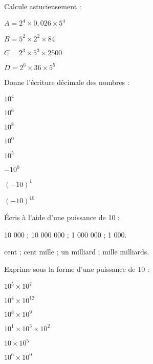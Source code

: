 \begin{exercice}[]
Calcule astucieusement :
\begin{colenumerate}{2} 
\item $A = 2^4 \times 0,026 \times 5^4$
\item $B = 5^2 \times 2^2 \times 84$
\item $C = 2^3 \times 5^3 \times 2 500$
\item $D = 2^6 \times 36 \times 5^5$
\end{colenumerate}
\end{exercice}





\begin{exercice}[]
Donne l'écriture décimale des nombres :

\begin{colenumerate}{4} 
\item $10^4$
\item $10^6$ 
\item $10^8$ 
\item $10^0$
\item $10^5$
\item $-10^0$
\item $(-10)^1$
\item $(-10)^{10}$
\end{colenumerate} 
\end{exercice}

\begin{exercice}[]
Écris à l'aide d'une puissance de 10 :

\begin{colenumerate}{1} 
\item 10 000 ; 10 000 000 ; 1 000 000 ; 1 000.
\item cent ; cent mille ; un milliard ; mille milliards.
\end{colenumerate} 
\end{exercice}

\begin{exercice}
Exprime sous la forme d'une puissance de 10 :

\begin{colenumerate}{2} 
\item $10^5 \times 10^7$
\item $10^4 \times 10^{12}$
\item $10^8 \times 10^9$
\item $10^1 \times 10^3 \times 10^2$
\item $10 \times 10^5$
\item $10^6 \times 10^0$
\end{colenumerate} 
\end{exercice}

